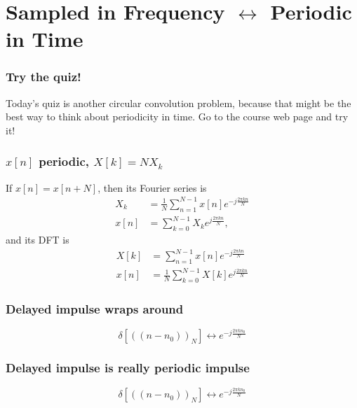 \documentclass{beamer}
\begin{document}
\section[Periodic in Time]{Sampled in Frequency $\leftrightarrow$ Periodic in Time}
\setcounter{subsection}{1}

\begin{frame}
  \frametitle{Try the quiz!}

  Today's quiz is another circular convolution problem, because that
  might be the best way to think about periodicity in time.  Go to the
  course web page and try it!
\end{frame}

\begin{frame}
  \frametitle{$x[n]$ periodic, $X[k]=NX_k$}

  If $x[n]=x[n+N]$, then its Fourier series is
  \begin{align*}
    X_k &= \frac{1}{N}\sum_{n=1}^{N-1} x[n]e^{-j\frac{2\pi kn}{N}}\\
    x[n] &= \sum_{k=0}^{N-1} X_k e^{j\frac{2\pi kn}{N}},
  \end{align*}
  and its DFT is
  \begin{align*}
    X[k] &= \sum_{n=1}^{N-1} x[n]e^{-j\frac{2\pi kn}{N}}\\
    x[n] &= \frac{1}{N}\sum_{k=0}^{N-1} X[k] e^{j\frac{2\pi kn}{N}}
  \end{align*}
\end{frame}
  
\begin{frame}
  \frametitle{Delayed impulse wraps around}

  \begin{displaymath}
    \delta\left[(\!(n-n_0)\!)_N\right] \leftrightarrow e^{-j\frac{2\pi kn_0}{N}}
  \end{displaymath}
  
  \centerline{}

\end{frame}

\begin{frame}
  \frametitle{Delayed impulse is really periodic impulse}

  \begin{displaymath}
    \delta\left[(\!(n-n_0)\!)_N\right] \leftrightarrow e^{-j\frac{2\pi kn_0}{N}}
  \end{displaymath}
  
  \centerline{}

\end{frame}
\end{document}
